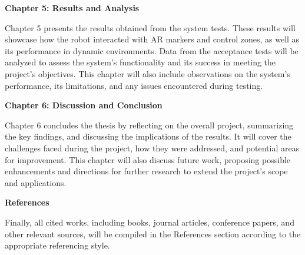 \textbf{Chapter 5: Results and Analysis}

Chapter 5 presents the results obtained from the system tests. These results will showcase how the robot interacted with AR markers and control zones, as well as its performance in dynamic environments. Data from the acceptance tests will be analyzed to assess the system’s functionality and its success in meeting the project’s objectives. This chapter will also include observations on the system's performance, its limitations, and any issues encountered during testing.

\textbf{Chapter 6: Discussion and Conclusion}

Chapter 6 concludes the thesis by reflecting on the overall project, summarizing the key findings, and discussing the implications of the results. It will cover the challenges faced during the project, how they were addressed, and potential areas for improvement. This chapter will also discuss future work, proposing possible enhancements and directions for further research to extend the project’s scope and applications.

\textbf{References}

Finally, all cited works, including books, journal articles, conference papers, and other relevant sources, will be compiled in the References section according to the appropriate referencing style.

